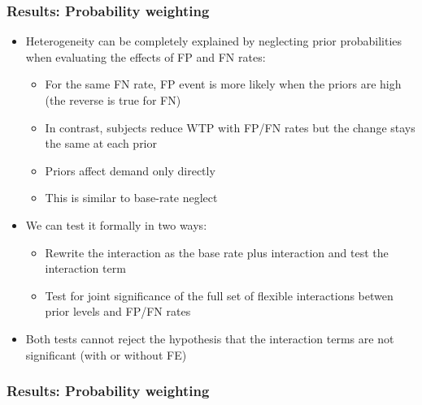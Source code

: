 \documentclass[11pt,hyperref={bookmarks=false}]{beamer}
\begin{document}
\begin{frame}
\frametitle{Results: Probability weighting}
\begin{itemize}
\item Heterogeneity can be completely explained by neglecting prior probabilities when evaluating the effects of FP and FN rates:
\begin{itemize}
\item For the same FN rate, FP event is more likely when the priors are high (the reverse is true for FN)
\item In contrast, subjects reduce WTP with FP/FN rates but the change stays the same at each prior
\item Priors affect demand only directly
\item This is similar to base-rate neglect
\end{itemize}
\item We can test it formally in two ways:
\begin{itemize}
\item Rewrite the interaction as the base rate plus interaction and test the interaction term
\item Test for joint significance of the full set of flexible interactions betwen prior levels and FP/FN rates
\end{itemize}
\item Both tests cannot reject the hypothesis that the interaction terms are not significant (with or without FE)
\end{itemize}
\end{frame}


\begin{frame}
\frametitle{Results: Probability weighting}
\scriptsize

\end{frame}
\end{document}
